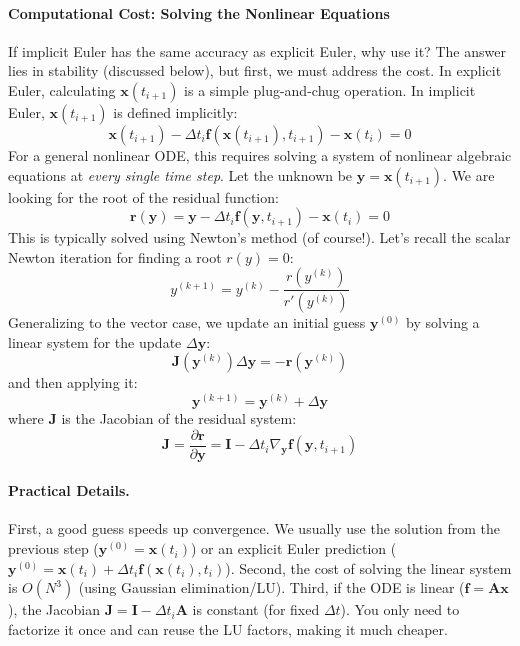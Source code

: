 \paragraph*{Computational Cost: Solving the Nonlinear Equations}
If implicit Euler has the same accuracy as explicit Euler, why use it? The answer lies in stability (discussed below), but first, we must address the cost. In explicit Euler, calculating $\mathbf{x}(t_{i+1})$ is a simple plug-and-chug operation. In implicit Euler, $\mathbf{x}(t_{i+1})$ is defined implicitly:
\begin{equation}
    \mathbf{x}(t_{i+1}) - \Delta t_i \mathbf{f}(\mathbf{x}(t_{i+1}), t_{i+1}) - \mathbf{x}(t_i) = 0
\end{equation}
For a general nonlinear ODE, this requires solving a system of nonlinear algebraic equations at \textit{every single time step}. Let the unknown be $\mathbf{y} = \mathbf{x}(t_{i+1})$. We are looking for the root of the residual function:
\begin{equation}
    \mathbf{r}(\mathbf{y}) = \mathbf{y} - \Delta t_i \mathbf{f}(\mathbf{y}, t_{i+1}) - \mathbf{x}(t_i) = 0
\end{equation}
This is typically solved using Newton's method (of course!). Let's recall the scalar Newton iteration for finding a root $r(y)=0$:
\begin{equation}
    y^{(k+1)} = y^{(k)} - \frac{r(y^{(k)})}{r'(y^{(k)})}
\end{equation}
Generalizing to the vector case, we update an initial guess $\mathbf{y}^{(0)}$ by solving a linear system for the update $\Delta \mathbf{y}$:
\begin{equation}
    \mathbf{J}(\mathbf{y}^{(k)}) \Delta \mathbf{y} = -\mathbf{r}(\mathbf{y}^{(k)})
\end{equation}
and then applying it:
\begin{equation}
    \mathbf{y}^{(k+1)} = \mathbf{y}^{(k)} + \Delta \mathbf{y}
\end{equation}
where $\mathbf{J}$ is the Jacobian of the residual system:
\begin{equation}
    \mathbf{J} = \frac{\partial \mathbf{r}}{\partial \mathbf{y}} = \mathbf{I} - \Delta t_i \nabla_{\mathbf{y}} \mathbf{f}(\mathbf{y}, t_{i+1})
\end{equation}

\paragraph*{Practical Details.} 
First, a good guess speeds up convergence. We usually use the solution from the previous step ($\mathbf{y}^{(0)} = \mathbf{x}(t_i)$) or an explicit Euler prediction ($\mathbf{y}^{(0)} = \mathbf{x}(t_i) + \Delta t_i \mathbf{f}(\mathbf{x}(t_i), t_i)$). Second, the cost of solving the linear system is $O(N^3)$ (using Gaussian elimination/LU). Third, if the ODE is linear ($\mathbf{f} = \mathbf{A}\mathbf{x}$), the Jacobian $\mathbf{J} = \mathbf{I} - \Delta t_i \mathbf{A}$ is constant (for fixed $\Delta t$). You only need to factorize it once and can reuse the LU factors, making it much cheaper.

